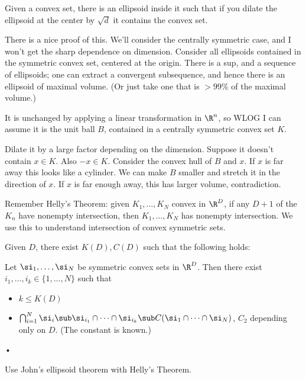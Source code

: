 Given a convex set, there is an ellipsoid inside it such that if you dilate the ellipsoid at the center by $\sqrt d$ it contains the convex set.

There is a nice proof of this. We'll consider the centrally symmetric case, and 
I won't get the sharp dependence on dimension.
Consider all ellipsoids contained in the symmetric convex set, centered at the origin. There is a sup, and a sequence of ellipsoids; one can extract a convergent subsequence, and hence there is an ellipsoid of maximal volume.
(Or just take one that is $>99\%$ of the maximal volume.)

It is unchanged by applying a linear transformation in $\R^n$, so WLOG I can assume it is the unit ball $B$, contained in a centrally symmetric convex set $K$.

Dilate it by a large factor depending on the dimension. Suppose it doesn't contain $x\in K$. Also $-x\in K$. Consider the convex hull of $B$ and $x$. If $x$ is far away this looks like a cylinder. We can make $B$ smaller and stretch it in the direction of $x$. If $x$ is far enough away, this has larger volume, contradiction.

Remember Helly's Theorem: given $K_1,\ldots, K_N$ convex in $\R^D$, if any $D+1$ of the $K_n$ have nonempty intersection, then $K_1,\ldots, K_N$ has nonempty intersection. We use this to understand intersection of convex symmetric sets.
\begin{lem}\label{c:john-helly}
Given $D$, there exist $K(D), C(D)$ such that the following holds: 

Let $\si_1,\ldots, \si_N$ be symmetric convex sets in $\R^D$. Then there exist $i_1,\ldots, i_k\in \{1,\ldots, N\}$ such that 
\begin{itemize}
\item
$k\le K(D)$
\item
$
\bigcap_{i=1}^N \si_i \sub \si_{i_1}\cap \cdots \cap \si_{i_k}\sub C (\si_1\cap \cdots \cap \si_N)$, $C_2$ depending only on $D$. (The constant is known.) %
\end{itemize}•
\end{lem}
Use John's ellipsoid theorem with Helly's Theorem. %
